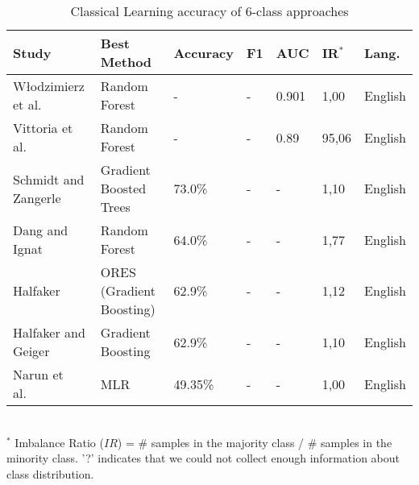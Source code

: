 \begin{table}[ht]
    \caption{Classical Learning accuracy of 6-class approaches }
    \label{tab:CL_performance_6class}
    \centering
    \begin{tabular}{l l l l l l l}
        \toprule
        \textbf{Study} & \textbf{Best Method} & \textbf{Accuracy} & \textbf{F1} & \textbf{AUC} & \textbf{IR$^*$} & \textbf{Lang.} \\ 
        \midrule
        Włodzimierz et al.~\cite{Lewoniewski2016_lr18} & Random Forest & - & - & 0.901 & 1,00 & English \\
        Vittoria et al.~\cite{Cozza2016_lr92} & Random Forest & - & - & 0.89 & 95,06 & English \\
        Schmidt and Zangerle~\cite{Schmidt2019_lr78} & Gradient Boosted Trees & 73.0\% & - & - & 1,10 & English \\
        Dang and Ignat~\cite{Dang2016_lr16} & Random Forest & 64.0\% & - & - & 1,77 & English \\
        Halfaker~\cite{Halfaker2017_lr22} & ORES (Gradient Boosting) & 62.9\% & - & - & 1,12 & English \\
        Halfaker and Geiger~\cite{Halfaker2020_lr1055} & Gradient Boosting & 62.9\% & - & - & 1,10 & English \\
        Narun et al.~\cite{Raman2020_lr64} & MLR & 49.35\% & - & - & 1,00 & English \\
        \bottomrule
    \end{tabular}
    \\ \vspace{0.1cm}
    \footnotesize
    $^*$ Imbalance Ratio ($IR$) = \# samples in the majority class / \# samples in the minority class. '?' indicates that we could not collect enough information about class distribution.
\end{table}